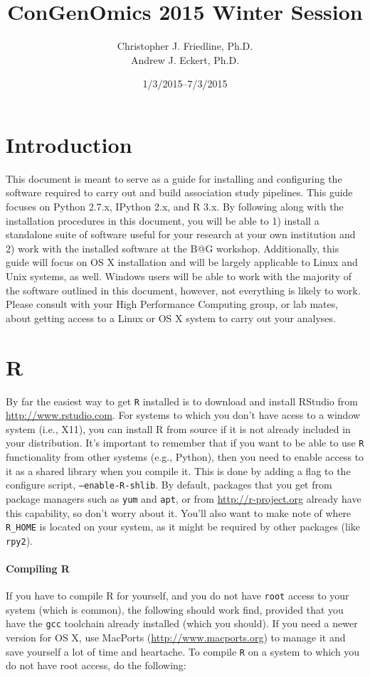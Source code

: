 \documentclass{article}
\title{ConGenOmics 2015 Winter Session}
\date{1/3/2015--7/3/2015}
\author{Christopher J. Friedline, Ph.D.\\Andrew J. Eckert, Ph.D.}
\begin{document}
\maketitle

\section*{Introduction}

This document is meant to serve as a guide for installing and configuring the
software required to carry out and build association study pipelines.  This
guide focuses on Python 2.7.x, IPython 2.x, and R 3.x.  By following along
with the installation procedures in this document, you will be able to 1)
install a standalone suite of software useful for your research at your own
institution and 2) work with the installed software at the B@G workshop.
Additionally, this guide will focus on OS X installation and will be largely
applicable to Linux and Unix systems, as well.  Windows users will be able to
work with the majority of the software outlined in this document, however, not
everything is likely to work.  Please consult with your High Performance
Computing group, or lab mates, about getting access to a Linux or OS X system
to carry out your analyses.

\section*{R}

By far the easiest way to get \texttt{R} installed is to download and install
RStudio from \url{http://www.rstudio.com}.  For systems to which you don't
have acess to a window system (i.e., X11), you can install R from source if it
is not already included in your distribution.  It's important to remember that
if you want to be able to use \texttt{R} functionality from other systems
(e.g., Python), then you need to enable access to it as a shared library when
you compile it.  This is done by adding a flag to the configure script,
\texttt{--enable-R-shlib}.  By default, packages that you get from package
managers such as \texttt{yum} and \texttt{apt}, or from
\url{http://r-project.org} already have this capability, so don't worry about
it.  You'll also want to make note of where \texttt{R\_HOME} is located on
your system, as it might be required by other packages (like \texttt{rpy2}).

\paragraph{Compiling R}
If you have to compile R for yourself, and you do not have \texttt{root} access
to your system (which is common), the following should work find, provided that
you have the \texttt{gcc} toolchain already installed (which you should).  If
you need a newer version for OS X, use MacPorts (\url{http://www.macports.org})
to manage it and save yourself a lot of time and heartache.  To compile
\texttt{R} on a system to which you do not have root access, do the following:
\end{document}
